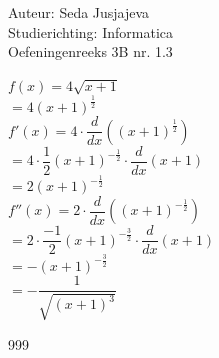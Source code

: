 \documentclass[a4paper]{article}
\begin{document}
\noindent \large Auteur: Seda Jusjajeva\\
\noindent \large Studierichting: Informatica\\
\noindent \large Oefeningenreeks 3B nr. 1.3 \\

\medskip

\normalsize


$f(x) = 4\sqrt{x+1}$ \\

$= 4(x + 1)^{\tfrac{1}{2}}$ \\

$f'(x) = 4\cdot\dfrac{d}{dx}\left((x + 1)^{\tfrac{1}{2}}\right)$ \\

$= 4\cdot\dfrac{1}{2}(x + 1)^{-\tfrac{1}{2}}\cdot\dfrac{d}{dx}(x + 1)$ \\

$= 2(x + 1)^{-\tfrac{1}{2}}$ \\

$f''(x) = 2\cdot\dfrac{d}{dx}\left((x + 1)^{-\tfrac{1}{2}}\right)$ \\

$= 2\cdot\dfrac{-1}{2}(x + 1)^{-\tfrac{3}{2}}\cdot\dfrac{d}{dx}(x + 1)$ \\

$= -(x + 1)^{-\tfrac{3}{2}}$ \\

$= -\dfrac{1}{\sqrt{(x + 1)^3}}$ \\




\begin{thebibliography}{999}
\end{thebibliography}
\end{document}
